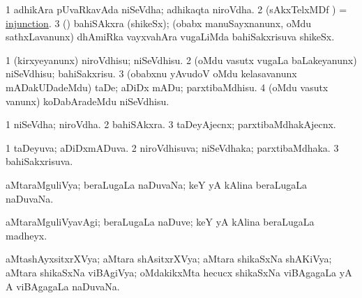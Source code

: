 \bentry
{}
\gl{\nA}
\bmng
\bnum
\num{1} adhikAra pUvaRkavAda niSeVdha; adhikaqta niroVdha. 
\num{2} (sAkxTelxMDf \nAyxshA) =  \hyperlink{injunction}{injunction}. 
\num{3} (\roVkAyx) bahiSAkxra (shikeSx); (obabx manuSayxnanunx, oMdu sathxLavanunx) dhAmiRka vayxvahAra \mo vugaLiMda bahiSakxrisuva shikeSx. 
\enum
\emng
\eentry

\bentry
{}
\gl{\sakirx}
\bmng
\bnum
\num{1} (kirxyeyanunx) niroVdhisu; niSeVdhisu. 
\num{2} (oMdu vasutx \mo vugaLa baLakeyanunx) niSeVdhisu; bahiSakxrisu. 
\num{3} (obabxnu yAvudoV oMdu kelasavanunx mADakUDadeMdu) taDe; aDiDx mADu; parxtibaMdhisu. 
\num{4} (oMdu vasutx \mo vanunx) koDabAradeMdu niSeVdhisu. 
\enum
\emng
\eentry

\bentry
{}
\gl{\nA}
\bmng
\bnum
\num{1} niSeVdha; niroVdha. 
\num{2} bahiSAkxra. 
\num{3} taDeyAjecnx; parxtibaMdhakAjecnx. 
\enum
\emng
\eentry

\bentry
{}
\gl{\gu}
\bmng
\bnum
\num{1} taDeyuva; aDiDxmADuva. 
\num{2} niroVdhisuva; niSeVdhaka; parxtibaMdhaka. 
\num{3} bahiSakxrisuva. 
\enum
\emng
\eentry

\bentry
{}
\gl{\gu}
\bmng
aMtaraMguliVya; beraLugaLa naDuvaNa; keY yA kAlina beraLugaLa naDuvaNa. 
\emng
\eentry

\bentry
{}
\gl{\kirxvi}
\bmng
aMtaraMguliVyavAgi; beraLugaLa naDuve; keY yA kAlina beraLugaLa madheyx. 
\emng
\eentry

\bentry
{}
\gl{\gu}
\bmng
aMtashAyxsitxrXVya; aMtara shAsitxrXVya; aMtara shikaSxNa shAKiVya; aMtara shikaSxNa viBAgiVya; oMdakikxMta hecucx shikaSxNa viBAgagaLa yA A viBAgagaLa naDuvaNa. 
\emng
\eentry

